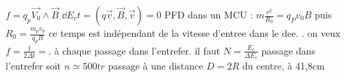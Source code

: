 \begin{Answer}
		\Question
		\subQuestion $f= q_p\vec{V_0}\wedge\vec{B}$
		\subQuestion $\dd{E_c}{t} = (q\vec{v},\vec{B},\vec{v})=0$
		\subQuestion PFD dans un MCU : $m\frac{v^2}{R_0} = q_Pv_0B$ puis $R_0=\frac{m_pv_0}{q_pB}$
		\subQuestion ce temps est indépendant de la vitesse d'entree dans le dee. .
		\Question
		\subQuestion on veux $f= \frac{1}{2\Delta t} =$.
		\subQuestion {} à chaque passage dans l'entrefer.
		\Question
		\subQuestion il faut $N=\frac{E_c}{\Delta E_c}$ passage dans l'entrefer soit $n \simeq 500 tr$
		\subQuestion {} passage à une distance $D=2R$ du centre, à 41,8cm
\end{Answer}
